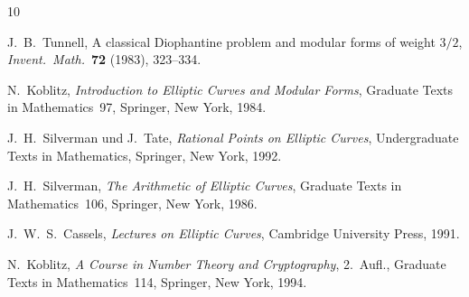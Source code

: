 \documentclass[12pt,a4paper]{amsart}
\theoremstyle{definition}
\begin{document}
\begin{thebibliography}{10}

J.~B.~Tunnell,
A classical Diophantine problem and modular forms of weight $3/2$,
\emph{Invent.\ Math.}\ \textbf{72} (1983), 323--334.

N.~Koblitz,
\emph{Introduction to Elliptic Curves and Modular Forms},
Graduate Texts in Mathematics~97,
Springer, New York, 1984.

J.~H.~Silverman und J.~Tate,
\emph{Rational Points on Elliptic Curves},
Undergraduate Texts in Mathematics,
Springer, New York, 1992.

J.~H.~Silverman,
\emph{The Arithmetic of Elliptic Curves},
Graduate Texts in Mathematics~106,
Springer, New York, 1986.

J.~W.~S.~Cassels,
\emph{Lectures on Elliptic Curves},
Cambridge University Press, 1991.

N.~Koblitz,
\emph{A Course in Number Theory and Cryptography}, 2.~Aufl.,
Graduate Texts in Mathematics~114,
Springer, New York, 1994.

\end{thebibliography}
\end{document}
